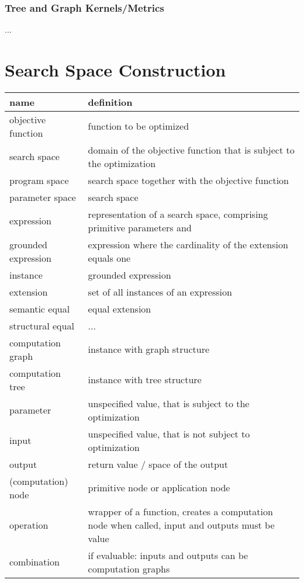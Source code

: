 \documentclass[english]{article}
\begin{document}
\subsubsection{Tree and Graph Kernels/Metrics}
...



\section{Search Space Construction}


\begin{table}
  \begin{tabular}{| l | l |}
    \hline
    name & definition \\
    \hline \hline
    objective function & function to be optimized \\
    search space &  domain of the objective function that is subject to the optimization\\
    program space & search space together with the objective function \\
    parameter space & search space \\
    expression & representation of a search space, comprising primitive parameters and \\
    grounded expression & expression where the cardinality of the extension equals one \\
    instance & grounded expression \\
    extension & set of all instances of an expression \\
    semantic equal & equal extension \\
    structural equal & ... \\
    computation graph & instance with graph structure \\
    computation tree & instance with tree structure \\
    parameter & unspecified value, that is subject to the optimization \\
    input & unspecified value, that is not subject to optimization \\
    output & return value / space of the output \\
    (computation) node & primitive node or application node \\
    operation & wrapper of a function, creates a computation node when called, input and outputs must be value \\
    combination & if evaluable: inputs and outputs can be computation graphs \\

\end{tabular}
\end{table}
\end{document}
